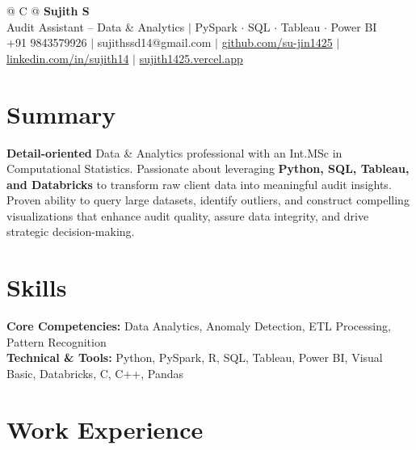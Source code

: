 \documentclass[a4paper,11pt]{article}
\newcommand{\ulink}[2]{\href{#1}{#2}}
\begin{document}
\pagestyle{empty}

\begin{tabularx}{\linewidth}{@{} C @{}}
{\color[HTML]{000000}\fontsize{30}{35}\selectfont\bfseries Sujith S} \\[5pt]
{\fontsize{10.5}{12.5}\selectfont\color[HTML]{3A3A3A}
Audit Assistant -- Data \& Analytics $|$ PySpark $\cdot$ SQL $\cdot$ Tableau $\cdot$ Power BI} \\[6pt]
{\fontsize{9.5}{11.5}\selectfont\textcolor[HTML]{3A3A3A}{+91 9843579926 $|$ sujithssd14@gmail.com $|$ \ulink{https://github.com/su-jin1425}{github.com/su-jin1425} $|$ \ulink{https://linkedin.com/in/sujith14}{linkedin.com/in/sujith14} $|$ \ulink{https://sujith1425.vercel.app}{sujith1425.vercel.app}}}
\end{tabularx}

\section{Summary}
\vspace{2pt}

{\color[HTML]{0A0A0A}\fontsize{11}{14}\selectfont
\textbf{Detail-oriented} Data \& Analytics professional with an Int.MSc in Computational Statistics. Passionate about leveraging \textbf{Python, SQL, Tableau, and Databricks} to transform raw client data into meaningful audit insights. Proven ability to query large datasets, identify outliers, and construct compelling visualizations that enhance audit quality, assure data integrity, and drive strategic decision-making.}

\section{Skills}
\vspace{2pt}

{\color[HTML]{0A0A0A}\fontsize{11}{14}\selectfont
\textbf{Core Competencies:} Data Analytics, Anomaly Detection, ETL Processing, Pattern Recognition \\[2pt]
\textbf{Technical \& Tools:} Python, PySpark, R, SQL, Tableau, Power BI, Visual Basic, Databricks, C, C++, Pandas}

\section{Work Experience}
\vspace{2pt}
\end{document}
